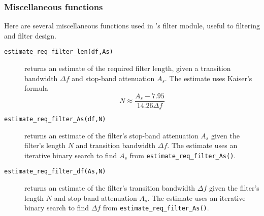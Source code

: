 \subsubsection{Miscellaneous functions}
\label{module:filter:misc}
Here are several miscellaneous functions used in \liquid's filter module,
useful to filtering and filter design.

\begin{description}
\item[{\tt estimate\_req\_filter\_len(df,As)}]
    returns an estimate of the required filter length, given a transition
    bandwidth $\Delta f$ and stop-band attenuation $A_s$.
    The estimate uses Kaiser's formula \cite{Vaidyanathan:1993}
    \begin{equation}
    \label{eqn:filter:firdes:misc:estimate_N}
        N \approx \frac{
                A_s - 7.95
            }{
                14.26 \Delta f
            }
    \end{equation}

\item[{\tt estimate\_req\_filter\_As(df,N)}]
    returns an estimate of the filter's stop-band attenuation $A_s$
    given the filter's length $N$ and transition bandwidth $\Delta f$.
    The estimate uses an iterative binary search to find $A_s$ from
    {\tt estimate\_req\_filter\_As()}.

\item[{\tt estimate\_req\_filter\_df(As,N)}]
    returns an estimate of the filter's transition bandwidth $\Delta f$
    given the filter's length $N$ and stop-band attenuation $A_s$.
    The estimate uses an iterative binary search to find $\Delta f$ from
    {\tt estimate\_req\_filter\_As()}.


\end{description}
